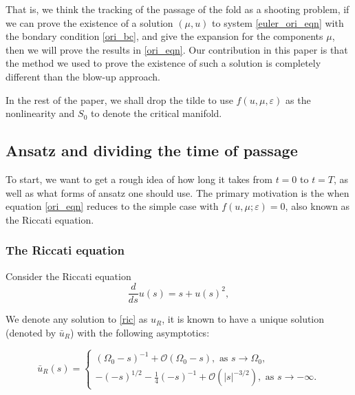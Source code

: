 \documentclass[letterpaper,11pt]{article}
\newcommand{\rmO}{\mathcal{O}}
\newcommand{\eps}{\varepsilon}
\numberwithin{equation}{section}
\theoremstyle{plain}
\begin{document}
That is, we think the tracking of the passage of the fold as a shooting problem, if we can prove the existence of a solution $(\mu, u)$ to system \eqref{euler_ori_eqn} with the bondary condition \eqref{ori_bc}, and give the expansion for the components $\mu$, then we will prove the results in \eqref{ori_eqn}. Our contribution in this paper is that the method we used to prove the existence of such a solution is completely different than the blow-up approach.

In the rest of the paper, we shall drop the tilde to use $f(u,\mu,\eps)$ as the nonlinearity and $S_0$ to denote the critical manifold.
 
\subsection{Ansatz and dividing the time of passage}\label{ansatz_divide}


\iffalse
\subsection{Equation}
For demonstration purposes, we focus on the following equation first
\begin{align}\label{euler_ori_eqn}
\begin{split}
\frac{d}{dt}u &= \mu+u^2+ u^3,\\
\frac{d}{dt}\mu &=  \eps ,
\end{split}
\end{align}
with boundary condition \ref{ori_bc}.
\fi

To start, we want to get a rough idea of how long it takes from $t=0$ to $t=T$, as well as what forms of ansatz one should use. The primary motivation is the when equation \eqref{ori_eqn} reduces to the simple case with $f(u,\mu;\eps) = 0$, also known as the Riccati equation.

\subsubsection{The Riccati equation}
Consider the Riccati equation
\begin{equation}\label{ric}
\frac{d}{ds}u(s) = s+u(s)^2,
\end{equation}

We denote any solution to \eqref{ric} as $u_R$, it is known to have a unique solution (denoted by $\bar{u}_R$) with the following asymptotics:

\begin{equation} \label{ric_asy}
\bar{u}_R(s)=\begin{cases}
  (\Omega_0-s)^{-1}+\rmO(\Omega_0-s), \text{ as }s \to \Omega_0, \\
 -(-s)^{1/2} -\frac{1}{4}(-s)^{-1} + \rmO(|s|^{-3/2}), \text{ as }s \to -\infty.
\end{cases}
\end{equation}
\end{document}
